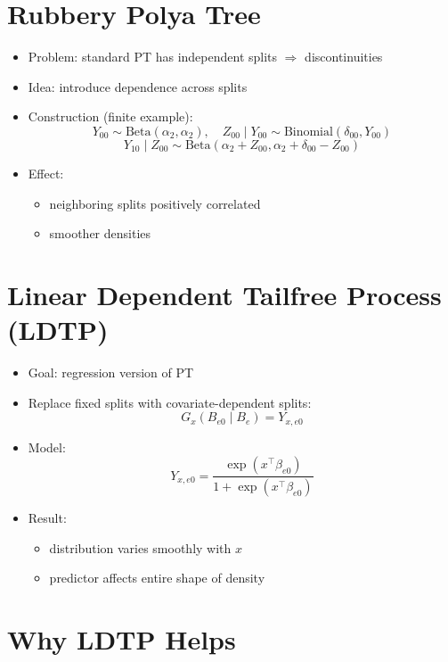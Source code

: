 \documentclass[12pt,oneside]{book}
\numberwithin{equation}{section}
\theoremstyle{definition}
\theoremstyle{plain}
\theoremstyle{remark}
\begin{document}
\section{Rubbery Polya Tree}

\begin{itemize}
\item Problem: standard PT has independent splits $\Rightarrow$ discontinuities

\item Idea: introduce dependence across splits

\item Construction (finite example):
\[
Y_{00} \sim \text{Beta}(\alpha_2,\alpha_2), \quad
Z_{00} \mid Y_{00} \sim \text{Binomial}(\delta_{00}, Y_{00})
\]
\[
Y_{10} \mid Z_{00} \sim \text{Beta}(\alpha_2 + Z_{00}, \alpha_2 + \delta_{00} - Z_{00})
\]

\item Effect:
\begin{itemize}
\item neighboring splits positively correlated
\item smoother densities
\end{itemize}
\end{itemize}

\section{Linear Dependent Tailfree Process (LDTP)}

\begin{itemize}
\item Goal: regression version of PT

\item Replace fixed splits with covariate-dependent splits:
\[
G_x(B_{e0} \mid B_e) = Y_{x,e0}
\]

\item Model:
\[
Y_{x,e0}
=
\frac{\exp(x^\top \beta_{e0})}{1 + \exp(x^\top \beta_{e0})}
\]

\item Result:
\begin{itemize}
\item distribution varies smoothly with $x$
\item predictor affects entire shape of density
\end{itemize}
\end{itemize}

\section{Why LDTP Helps}
\end{document}
